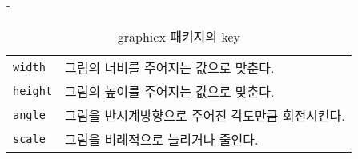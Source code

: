 \begin{adjustwidth}{0pt}{-\margheadwidth}


\begin{table}[!tb]
\caption{\textsf{graphicx} 패키지의 key}
\label{keyvals}
\begin{lined}{9.5cm}
\begin{tabular}{@{}ll}
\texttt{width}& 그림의 너비를 주어지는 값으로 맞춘다. \\
\texttt{height}& 그림의 높이를 주어지는 값으로 맞춘다. \\
\texttt{angle}& 그림을 반시계방향으로 주어진 각도만큼 회전시킨다.\\
\texttt{scale}& 그림을 비례적으로 늘리거나 줄인다.\\[-1ex]
\end{tabular}

\bigskip
\end{lined}
\end{table}


\end{adjustwidth}
